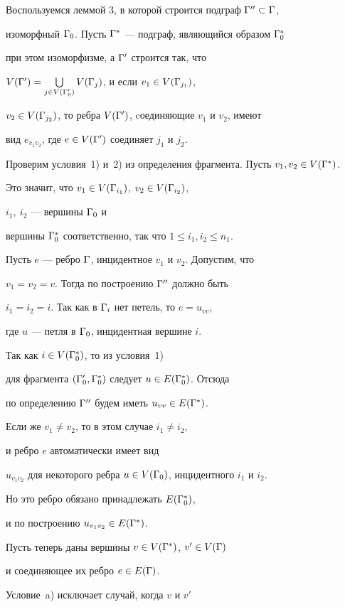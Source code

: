\begin{pf}


Воспользуемся леммой 3, в которой строится подграф ${\Gamma}''\subset {\Gamma}$, 


изоморфный ${\Gamma}_0$. Пусть ${\Gamma}^*$ --- подграф, являющийся образом ${\Gamma}^*_0$ 


при этом изоморфизме, а ${\Gamma}'$ строится так, что 


$V({\Gamma}')=\bigcup\limits_{j\in V({\Gamma}'_0)}V({\Gamma}_j)$, и если $v_1\in V({\Gamma}_{j_1})$, 


$v_2\in V({\Gamma}_{j_2})$, то ребра $V({\Gamma}')$, cоединяющие $v_1$ и $v_2$, имеют 


вид $e_{v_1v_2}$, где $e\in V({\Gamma}')$ соединяет $j_1$ и $j_2$.


Проверим условия~1) и~2) из определения фрагмента. Пусть $v_1, v_2\in V({\Gamma}^*)$.


Это значит, что $v_1\in V({\Gamma}_{i_1})$, $v_2\in V({\Gamma}_{i_2})$,


$i_1, \ i_2$ --- вершины ${\Gamma}_0$ и


вершины ${\Gamma}^*_0$ соответственно, так что $1\leq i_1, i_2\leq n_1$. 


Пусть $e$ --- ребро ${\Gamma}$, инцидентное $v_1$ и $v_2$. Допустим, что 


$v_1=v_2=v$. Тогда по построению ${\Gamma}''$ должно быть 


$i_1=i_2=i$. Так как в ${\Gamma}_i$ нет петель, то $e=u_{vv}$, 


где $u$ --- петля в ${\Gamma}_0$, инцидентная вершине $i$.


Так как $i\in V({\Gamma}^*_0)$, то из условия~1) 


для фрагмента $({\Gamma}'_0, {\Gamma}^*_0)$ следует $u\in E({\Gamma}^*_0)$. Отсюда 


по определению ${\Gamma}''$ будем иметь $u_{vv}\in E({\Gamma}^*)$.


Если же $v_1\ne v_2$, то в этом случае $i_1\ne i_2$, 


и ребро $e$ автоматически имеет вид


$u_{v_1v_2}$ для некоторого ребра $u\in V({\Gamma}_0)$, инцидентного $i_1$ и $i_2$.


Но это ребро обязано принадлежать $E({\Gamma}^*_0)$, 


и по построению $u_{v_1v_2}\in E({\Gamma}^*)$.





Пусть теперь даны вершины $v\in V({\Gamma}^*)$, $v'\in V({\Gamma})$ 


и соединяющее их ребро $e\in E({\Gamma})$.


Условие~a) исключает случай, когда $v$ и $v'$ 



\end{pf}
